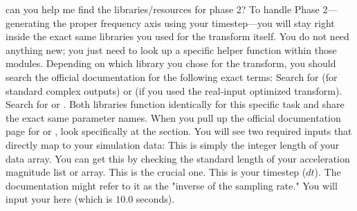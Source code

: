 \markdownRendererInterblockSeparator
{}can you help me find the libraries/resources for phase 2?\markdownRendererInterblockSeparator
{}
\markdownRendererSectionEnd \markdownRendererSectionBegin
{}\markdownRendererInterblockSeparator
{}To handle Phase 2—generating the proper frequency axis using your timestep—you will stay right inside the exact same libraries you used for the transform itself. You do not need anything new; you just need to look up a specific helper function within those modules.\markdownRendererInterblockSeparator
{}\markdownRendererSectionBegin
{}\markdownRendererInterblockSeparator
{}Depending on which library you chose for the transform, you should search the official documentation for the following exact terms:\markdownRendererInterblockSeparator
{}\markdownRendererUlBegin
\markdownRendererUlItem {} Search for  (for standard complex outputs) or  (if you used the real-input optimized transform).\markdownRendererUlItemEnd 
\markdownRendererUlItem {} Search for  or .\markdownRendererUlItemEnd 
\markdownRendererUlEnd \markdownRendererInterblockSeparator
{}Both libraries function identically for this specific task and share the exact same parameter names.\markdownRendererInterblockSeparator
{}
\markdownRendererSectionEnd \markdownRendererSectionBegin
{}\markdownRendererInterblockSeparator
{}When you pull up the official documentation page for  or , look specifically at the  section. You will see two required inputs that directly map to your simulation data:\markdownRendererInterblockSeparator
{}\markdownRendererOlBegin
{} This is simply the integer length of your data array. You can get this by checking the standard length of your acceleration magnitude list or array.\markdownRendererOlItemEnd 
{} This is the crucial one. This is your timestep ($dt$). The documentation might refer to it as the "inverse of the sampling rate." You will input your  here (which is $10.0$ seconds).\markdownRendererOlItemEnd 

